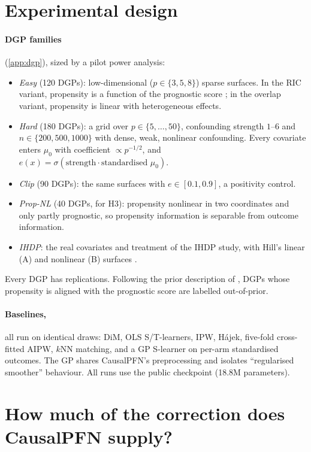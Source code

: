\documentclass{article}
\begin{document}
\section{Experimental design}\label{sec:design}
\paragraph{DGP families} (\cref{app:dgp}), sized by a pilot power analysis:
\begin{itemize}
\item \emph{Easy} (120 DGPs): low-dimensional ($p\in\{3,5,8\}$) sparse surfaces. In the RIC variant, propensity is a function of the prognostic score \citep{hahn2018regularization}; in the overlap variant, propensity is linear with heterogeneous effects.
\item \emph{Hard} (180 DGPs): a grid over $p\in\{5,\dots,50\}$, confounding strength $1$--$6$ and $n\in\{200,500,1000\}$ with dense, weak, nonlinear confounding. Every covariate enters $\mu_0$ with coefficient $\propto p^{-1/2}$, and $e(x)=\sigma(\text{strength}\cdot\text{standardised }\mu_0)$.
\item \emph{Clip} (90 DGPs): the same surfaces with $e\in[0.1,0.9]$, a positivity control.
\item \emph{Prop-NL} (40 DGPs, for H3): propensity nonlinear in two coordinates and only partly prognostic, so propensity information is separable from outcome information.
\item \emph{IHDP}: the real covariates and treatment of the IHDP study, with Hill's linear (A) and nonlinear (B) surfaces \citep{hill2011bayesian,louizos2017cevae}.
\end{itemize}
Every DGP has \nReps{} replications. Following the prior description of \citet{balazadeh2025causalpfn}, DGPs whose propensity is aligned with the prognostic score are labelled out-of-prior.

\paragraph{Baselines,} all run on identical draws: DiM, OLS S/T-learners, IPW, Hájek, five-fold cross-fitted AIPW, $k$NN matching, and a GP S-learner on per-arm standardised outcomes. The GP shares CausalPFN's preprocessing and isolates ``regularised smoother'' behaviour. All runs use the public checkpoint (18.8M parameters).

\section{How much of the correction does CausalPFN supply?}\label{sec:h1}
\end{document}
